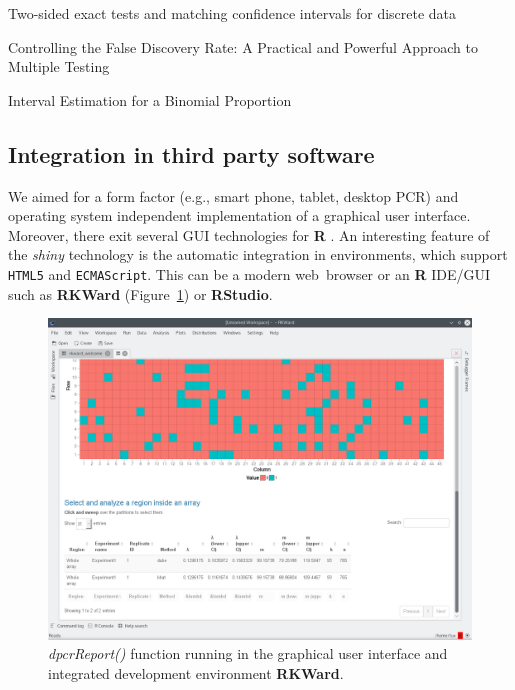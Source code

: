 \documentclass[a4,center,fleqn]{NAR}
\begin{document}
Two-sided exact tests and matching confidence intervals for discrete data \cite{fay_2010}

Controlling the False Discovery Rate: A Practical and Powerful Approach to Multiple Testing \cite{benjamini_1995}

Interval Estimation for a Binomial Proportion \cite{brown_2001}

\subsection{Integration in third party software}

We aimed for a form factor (e.g., smart phone, tablet, desktop PCR) and 
operating system independent implementation of a graphical user interface. 
Moreover, there exit several GUI technologies for \textbf{R} 
\cite{rodiger_rkward_2012}. An interesting feature of the \textit{shiny} 
technology is the automatic integration in environments, which support 
\texttt{HTML5} and \texttt{ECMAScript}. This can be a modern web~browser or an 
\textbf{R} IDE/GUI such as \textbf{RKWard} (Figure~\ref{GUI_RKWard_1}) or 
\textbf{RStudio}.

\begin{figure}[t]
\begin{center}
\includegraphics[width=17cm]{GUI_RKWard_1.png}
\end{center}
\caption{\textit{dpcrReport()} function running in the graphical user interface and integrated development environment \textbf{RKWard}.}
\label{GUI_RKWard_1}
\end{figure}
\end{document}
